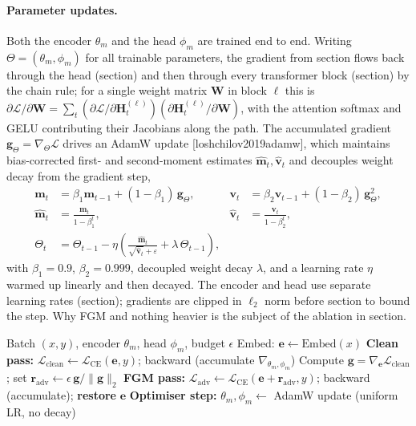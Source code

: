 \documentclass[11pt,a4paper]{article}
\def\citep#1{[#1]}%
\def\cref#1{section}%
\def\texttt#1{#1}%
\begin{document}
\paragraph{Parameter updates.} Both the encoder $\theta_m$ and the head $\phi_m$ are trained end to end. Writing $\Theta = (\theta_m, \phi_m)$ for all trainable parameters, the gradient from \cref{eq:fgm-loss} flows back through the head (\cref{eq:head,eq:pool}) and then through every transformer block (\cref{eq:block,eq:mha,eq:attention}) by the chain rule; for a single weight matrix $\mathbf{W}$ in block $\ell$ this is $\partial \mathcal{L}/\partial \mathbf{W} = \sum_t (\partial \mathcal{L}/\partial \mathbf{H}^{(\ell)}_t)(\partial \mathbf{H}^{(\ell)}_t/\partial \mathbf{W})$, with the attention softmax and GELU contributing their Jacobians along the path. The accumulated gradient $\mathbf{g}_\Theta = \nabla_\Theta \mathcal{L}$ drives an AdamW update \citep{loshchilov2019adamw}, which maintains bias-corrected first- and second-moment estimates $\hat{\mathbf{m}}_t, \hat{\mathbf{v}}_t$ and decouples weight decay from the gradient step,
\begin{align}
\mathbf{m}_t &= \beta_1 \mathbf{m}_{t-1} + (1-\beta_1)\,\mathbf{g}_\Theta, &
\mathbf{v}_t &= \beta_2 \mathbf{v}_{t-1} + (1-\beta_2)\,\mathbf{g}_\Theta^{2}, \label{eq:adam-moments}\\[2pt]
\hat{\mathbf{m}}_t &= \frac{\mathbf{m}_t}{1-\beta_1^{t}}, &
\hat{\mathbf{v}}_t &= \frac{\mathbf{v}_t}{1-\beta_2^{t}}, \nonumber\\[2pt]
\Theta_{t} &= \Theta_{t-1} - \eta\left(\frac{\hat{\mathbf{m}}_t}{\sqrt{\hat{\mathbf{v}}_t} + \varepsilon} + \lambda\,\Theta_{t-1}\right), \label{eq:adamw-update}
\end{align}
with $\beta_1 = 0.9$, $\beta_2 = 0.999$, decoupled weight decay $\lambda$, and a learning rate $\eta$ warmed up linearly and then decayed. The encoder and head use separate learning rates (\cref{tab:hparams}); gradients are clipped in $\ell_2$ norm before \cref{eq:adamw-update} to bound the step. Why FGM and nothing heavier is the subject of the ablation in \cref{sec:ablation-results}.

\begin{algorithm}[!htbp]
\caption{Cross-entropy $+$ FGM fine-tuning of one backbone (single mini-batch).}
\label{alg:fgm}
\begin{algorithmic}[1]
\Require Batch $(x, y)$, encoder $\theta_m$, head $\phi_m$, budget $\epsilon$
\State Embed: $\mathbf{e} \leftarrow \mathrm{Embed}(x)$
\State \textbf{Clean pass:} $\mathcal{L}_{\mathrm{clean}} \leftarrow \mathcal{L}_{\mathrm{CE}}(\mathbf{e}, y)$;\; \texttt{backward} (accumulate $\nabla_{\theta_m,\phi_m}$)
\State Compute $\mathbf{g} = \nabla_{\mathbf{e}}\mathcal{L}_{\mathrm{clean}}$;\; set $\mathbf{r}_{\mathrm{adv}} \leftarrow \epsilon\,\mathbf{g}/\|\mathbf{g}\|_2$ \Comment{\cref{eq:fgm}}
\State \textbf{FGM pass:} $\mathcal{L}_{\mathrm{adv}} \leftarrow \mathcal{L}_{\mathrm{CE}}(\mathbf{e} + \mathbf{r}_{\mathrm{adv}}, y)$;\; \texttt{backward} (accumulate);\; \textbf{restore} $\mathbf{e}$
\State \textbf{Optimiser step:} $\theta_m, \phi_m \leftarrow$ AdamW update (uniform LR, no decay)
\end{algorithmic}
\end{algorithm}
\end{document}
